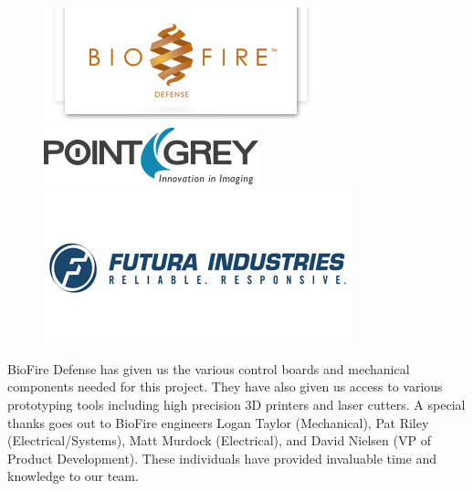 \documentclass[final, letterpaper, 10 pt, conference, onecolumn]{IEEEtran}
\begin{document}
\begin{figure}[!htb]
  \includegraphics[width=\linewidth]{biofire_logo.png}
  \label{fig:biofire_logo}
\endminipage\hfill
{}
  \includegraphics[width=\linewidth]{point_grey.png}
  \label{fig:point_grey}
\endminipage\hfill
{}%
  \includegraphics[width=\linewidth]{futura_indust.jpg}
  \label{fig:futura_indst}
\endminipage
\label{fig:project_sponsors}
\end{figure}

BioFire Defense has given us the various control boards and mechanical components needed for this project. They have also given us access to various prototyping tools including high precision 3D printers and laser cutters. A special thanks goes out to BioFire engineers Logan Taylor (Mechanical), Pat Riley (Electrical/Systems), Matt Murdock (Electrical), and David Nielsen (VP of Product Development). These individuals have provided invaluable time and knowledge to our team.
\end{document}
